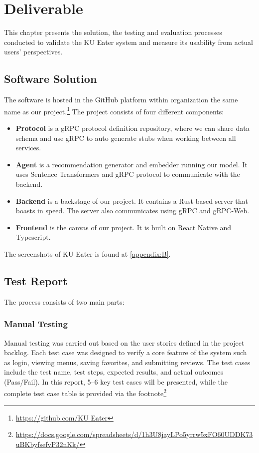 \chapter{Deliverable}
\label{chap:deliverable}
This chapter presents the solution, the testing and evaluation processes conducted to validate the KU Eater system and measure its usability from actual users' perspectives.

\section{Software Solution}
\label{section:software-solution}
The software is hosted in the GitHub platform within organization the same name as our project.\footnote{\url{https://github.com/KU Eater}}
The project consists of four different components:
\begin{itemize}[leftmargin=40pt]
    \item \textbf{Protocol} is a gRPC protocol definition repository, where we can share data schema and use gRPC to auto generate stubs when working between all services.
    \item \textbf{Agent} is a recommendation generator and embedder running our model. It uses Sentence Transformers and gRPC protocol to communicate with the backend.
    \item \textbf{Backend} is a backstage of our project. It contains a Rust-based server that boasts in speed. The server also communicates using gRPC and gRPC-Web.
    \item \textbf{Frontend} is the canvas of our project. It is built on React Native and Typescript.
\end{itemize}

The screenshots of KU Eater is found at \ref{appendix:B}.

\section{Test Report}
\label{section:test-report}
The process consists of two main parts:

\subsection{Manual Testing}
\label{subsection:manual-test}
Manual testing was carried out based on the user stories defined in the project backlog. Each test case was designed to verify a core feature of the system such as login, viewing menus, saving favorites, and submitting reviews. The test cases include the test name, test steps, expected results, and actual outcomes (Pass/Fail). In this report, 5–6 key test cases will be presented, while the complete test case table is provided via the footnote\footnote{\url{https://docs.google.com/spreadsheets/d/1h3U8jayLPo5yrrw5xFO60UDDK73uBKbyfsefvP32nKk/}}

